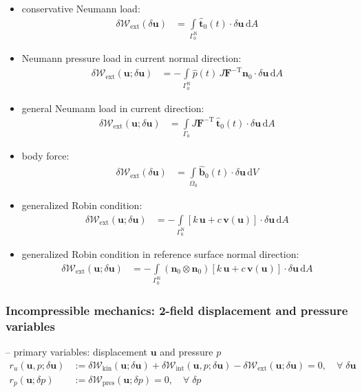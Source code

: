 \documentclass[a4paper,12pt]{report}
\newcommand{\bs}[1]{\boldsymbol{#1}}
\newcommand{\Om}{\mathit{\Omega}}
\newcommand{\Gm}{\mathit{\Gamma}}
\begin{document}
\begin{itemize}
\item conservative Neumann load:
\begin{align}
\delta \mathcal{W}_{\mathrm{ext}}(\delta\bs{u}) &= \int\limits_{\Gm_{0}^{\mathrm{N}}} \hat{\bs{t}}_{0}(t) \cdot \delta\bs{u} \,\mathrm{d}A \label{eq:deltaWext_pk1}
\end{align}
\item Neumann pressure load in current normal direction:
\begin{align}
\delta \mathcal{W}_{\mathrm{ext}}(\bs{u};\delta\bs{u}) &= -\int\limits_{\Gm_{0}^{\mathrm{N}}} \hat{p}(t)\,J \bs{F}^{-\mathrm{T}}\bs{n}_{0} \cdot \delta\bs{u} \,\mathrm{d}A \label{eq:deltaWext_cur_p}
\end{align}
\item general Neumann load in current direction:
\begin{align}
\delta \mathcal{W}_{\mathrm{ext}}(\bs{u};\delta\bs{u}) &= \int\limits_{\Gm_0} J\boldsymbol{F}^{-\mathrm{T}}\,\hat{\boldsymbol{t}}_{0}(t) \cdot \delta\boldsymbol{u} \,\mathrm{d}A \label{eq:deltaWext_cur}
\end{align}
\item body force:
\begin{align}
\delta \mathcal{W}_{\mathrm{ext}}(\delta\bs{u}) &= \int\limits_{\Om_{0}} \hat{\bs{b}}_{0}(t) \cdot \delta\bs{u} \,\mathrm{d}V \label{eq:deltaWext_body}
\end{align}

\item generalized Robin condition:
\begin{align}
\delta \mathcal{W}_{\mathrm{ext}}(\bs{u};\delta\bs{u}) &= -\int\limits_{\Gm_{0}^{\mathrm{N}}} \left[k\,\bs{u} + c\,\bs{v}(\bs{u})\right] \cdot \delta\bs{u}\,\mathrm{d}A \label{eq:deltaWext_rob}
\end{align} 
\item generalized Robin condition in reference surface normal direction:
\begin{align}
\delta \mathcal{W}_{\mathrm{ext}}(\bs{u};\delta\bs{u}) &= -\int\limits_{\Gm_{0}^{\mathrm{N}}} (\bs{n}_0 \otimes \bs{n}_0)\left[k\,\bs{u} + c\,\bs{v}(\bs{u})\right] \cdot \delta\bs{u}\,\mathrm{d}A \label{eq:deltaWext_robn}
\end{align}

\end{itemize}


\subsubsection{Incompressible mechanics: 2-field displacement and pressure variables}
-- primary variables: displacement $\bs{u}$ and pressure $p$
\begin{align}
r_u(\bs{u},p;\delta\bs{u}) &:= \delta \mathcal{W}_{\mathrm{kin}}(\bs{u};\delta\bs{u}) + \delta \mathcal{W}_{\mathrm{int}}(\bs{u},p;\delta\bs{u}) - \delta \mathcal{W}_{\mathrm{ext}}(\bs{u};\delta\bs{u}) = 0, \quad \forall \; \delta\bs{u} \label{eq:res_u_solid_incomp}\\
r_p(\bs{u};\delta p) &:= \delta \mathcal{W}_{\mathrm{pres}}(\bs{u};\delta p) = 0, \quad \forall \; \delta p
\end{align}
\end{document}

